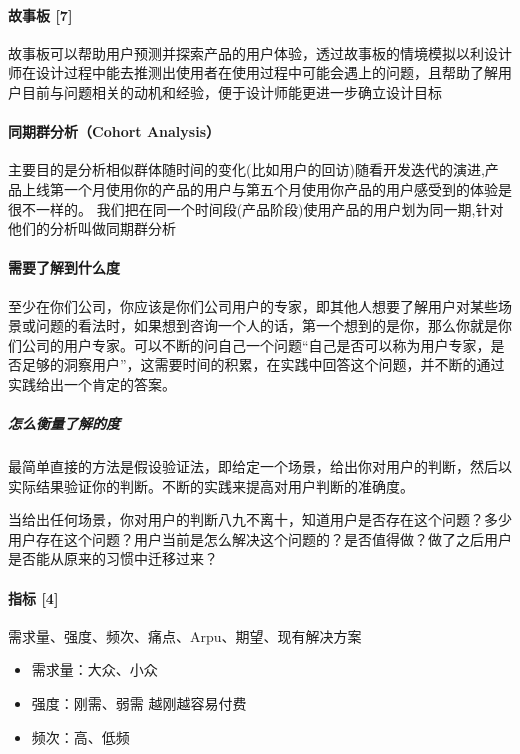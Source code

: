 \documentclass[letterpaper,11pt,english]{sphinxmanual}
\begin{document}
\paragraph{故事板 {[}7{]}}
\label{\detokenize{chapter_knowledge/users_analysis:id20}}
故事板可以帮助用户预测并探索产品的用户体验，透过故事板的情境模拟以利设计师在设计过程中能去推测出使用者在使用过程中可能会遇上的问题，且帮助了解用户目前与问题相关的动机和经验，便于设计师能更进一步确立设计目标


\paragraph{同期群分析（Cohort Analysis）}
\label{\detokenize{chapter_knowledge/users_analysis:cohort-analysis}}
主要目的是分析相似群体随时间的变化(比如用户的回访)随看开发迭代的演进,产品上线第一个月使用你的产品的用户与第五个月使用你产品的用户感受到的体验是很不一样的。
我们把在同一个时间段(产品阶段)使用产品的用户划为同一期,针对他们的分析叫做同期群分析


\paragraph{需要了解到什么度}
\label{\detokenize{chapter_knowledge/users_analysis:id21}}
至少在你们公司，你应该是你们公司用户的专家，即其他人想要了解用户对某些场景或问题的看法时，如果想到咨询一个人的话，第一个想到的是你，那么你就是你们公司的用户专家。可以不断的问自己一个问题“自己是否可以称为用户专家，是否足够的洞察用户”，这需要时间的积累，在实践中回答这个问题，并不断的通过实践给出一个肯定的答案。


\subparagraph{怎么衡量了解的度}
\label{\detokenize{chapter_knowledge/users_analysis:id22}}
最简单直接的方法是假设验证法，即给定一个场景，给出你对用户的判断，然后以实际结果验证你的判断。不断的实践来提高对用户判断的准确度。

当给出任何场景，你对用户的判断八九不离十，知道用户是否存在这个问题？多少用户存在这个问题？用户当前是怎么解决这个问题的？是否值得做？做了之后用户是否能从原来的习惯中迁移过来？


\paragraph{指标 {[}4{]}}
\label{\detokenize{chapter_knowledge/users_analysis:id23}}
需求量、强度、频次、痛点、Arpu、期望、现有解决方案
\begin{itemize}
\item {} 
需求量：大众、小众

\item {} 
强度：刚需、弱需 越刚越容易付费

\item {} 
频次：高、低频

\end{itemize}
\end{document}
